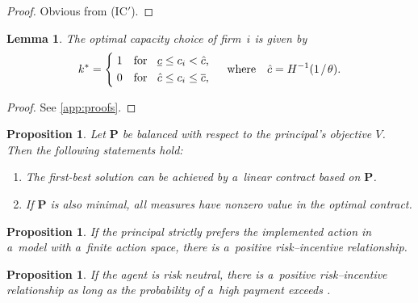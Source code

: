 \documentclass[12pt, a4paper, oneside]{article}
\newlength{\baselinedist}
\newcommand*{\divslash}{%
	\mathbin{%
		\nonscript\mskip-2mu / \nonscript\mskip-2mu%
	}%
}  %
\theoremstyle{Plain}
\newtheorem{lemma}[theorem]{Lemma}
\newtheorem{proposition}[theorem]{Satz}
\newtheorem{proposition}[theorem]{Proposition}
\theoremstyle{Definition}
\theoremstyle{Remark}
\begin{document}
\begin{proof}%
	Obvious from (IC$'$).
\end{proof}

\begin{lemma}
	\label{lemma:budde-goex-1}
	The optimal capacity choice of firm~$i$ is given by
	\begin{equation*}
		k^* =
		\begin{cases*}
			\strut \; 1 & for\;\; $\underline{c} \leq c_i < \hat{c}$, \\
			\strut \; 0 & for\;\; $\hat{c} \leq c_i \leq \overline{c}$,
		\end{cases*}
		\quad \text{where} \quad \hat{c} = H^{-1}(1 \divslash \theta).
	\end{equation*}
\end{lemma}

\begin{proof}
	See \autoref{app:proofs}.
\end{proof}

\begin{proposition}
	\label{proposition:budde-1}
	Let $\bm{P}$ be balanced with respect to the principal's objective $V$. Then the following statements hold:
	\begin{enumerate}[label = (\roman*), align = right, leftmargin = \baselinedist, labelsep = 0.3\baselinedist]
		\item The first-best solution can be achieved by a~linear contract based on $\bm{P}$.
		\item If $\bm{P}$ is also minimal, all measures have nonzero value in the optimal contract.
	\end{enumerate}
\end{proposition}

\begin{proposition}
	\label{proposition:budde-kraekel-3}
	If the principal strictly prefers the implemented action in a~model with a~finite action space, there is a~positive risk--incentive relationship.
\end{proposition}

\begin{proposition}
	\label{proposition:budde-kraekel-4}
	If the agent is risk neutral, there is a~positive risk--incentive relationship as long as the probability of a~high payment exceeds \textonehalf.
\end{proposition}
\end{document}
